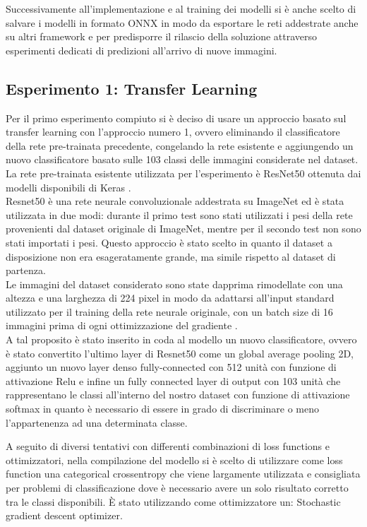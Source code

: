 Successivamente all'implementazione e al training dei modelli si è anche scelto di salvare i modelli in formato ONNX in modo da esportare le reti addestrate anche su altri framework e per predisporre il rilascio della soluzione attraverso esperimenti dedicati di predizioni all'arrivo di nuove immagini. 

\subsection{Esperimento 1: Transfer Learning}
Per il primo esperimento compiuto si è deciso di usare un approccio basato sul transfer learning con l'approccio numero 1, ovvero eliminando il classificatore della rete pre-trainata precedente, congelando la rete esistente e aggiungendo un nuovo classificatore basato sulle 103 classi delle immagini considerate nel dataset.  
La rete pre-trainata esistente utilizzata per l'esperimento è ResNet50 \cite{resnet50} ottenuta dai modelli disponibili di Keras \cite{keras_resnet50}. \\
Resnet50 è una rete neurale convoluzionale addestrata su ImageNet ed è stata utilizzata in due modi: durante il primo test sono stati utilizzati i pesi della rete provenienti dal dataset originale di ImageNet, mentre per il secondo test non sono stati importati i pesi.  
Questo approccio è stato scelto in quanto il dataset a disposizione non era esageratamente grande, ma simile rispetto al dataset di partenza. \\
Le immagini del dataset considerato sono state dapprima rimodellate con una altezza e una larghezza di 224 pixel in modo da adattarsi all'input standard utilizzato per il training della rete neurale originale, con un batch size di 16 immagini prima di ogni ottimizzazione del gradiente \cite{batch_size}.\\
A tal proposito è stato inserito in coda al modello un nuovo classificatore, ovvero è stato convertito l'ultimo layer di Resnet50 come un global average pooling 2D, aggiunto un nuovo layer denso fully-connected con 512 unità con funzione di attivazione Relu e infine un fully connected layer di output con 103 unità che rappresentano le classi all'interno del nostro dataset con funzione di attivazione softmax in quanto è necessario di essere in grado di discriminare o meno l'appartenenza ad una determinata classe. \bigskip

A seguito di diversi tentativi con differenti combinazioni di loss functions e ottimizzatori, nella compilazione del modello si è scelto di utilizzare come loss function una categorical crossentropy \cite{categorical_crossentropy} che viene largamente utilizzata e consigliata per problemi di classificazione dove è necessario avere un solo risultato corretto tra le classi disponibili. È stato utilizzando come ottimizzatore un: Stochastic gradient descent optimizer. \bigskip

